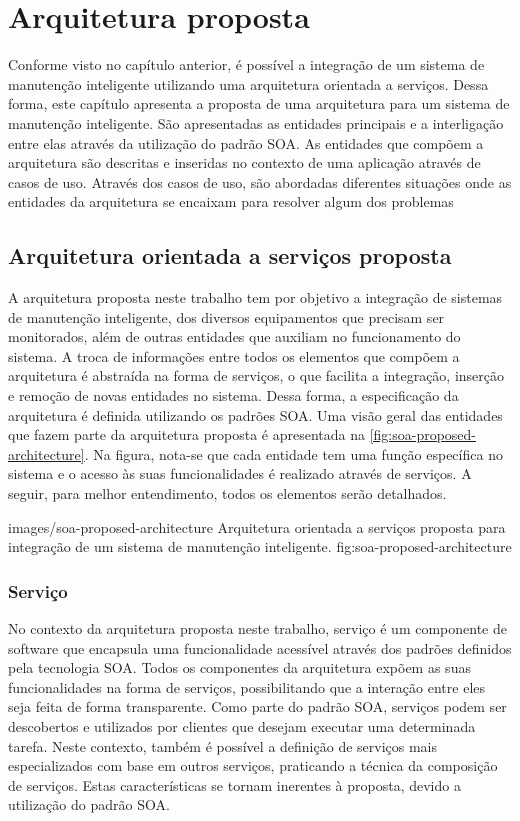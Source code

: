 \chapter{Arquitetura proposta}

Conforme visto no capítulo anterior, é possível a integração de um sistema de manutenção inteligente
utilizando uma arquitetura orientada a serviços. Dessa forma, este capítulo apresenta a proposta de
uma arquitetura para um sistema de manutenção inteligente. São apresentadas as entidades principais
e a interligação entre elas através da utilização do padrão \gls{SOA}. As entidades que compõem a
arquitetura são descritas e inseridas no contexto de uma aplicação através de casos de uso. Através
dos casos de uso, são abordadas diferentes situações onde as entidades da arquitetura se encaixam
para resolver algum dos problemas


\section{Arquitetura orientada a serviços proposta}

A arquitetura proposta neste trabalho tem por objetivo a integração de sistemas de manutenção
inteligente, dos diversos equipamentos que precisam ser monitorados, além de outras entidades que
auxiliam no funcionamento do sistema. A troca de informações entre todos os elementos que compõem a
arquitetura é abstraída na forma de serviços, o que facilita a integração, inserção e remoção de
novas entidades no sistema. Dessa forma, a especificação da arquitetura é definida utilizando os
padrões \gls{SOA}. Uma visão geral das entidades que fazem parte da arquitetura proposta é
apresentada na \cref{fig:soa-proposed-architecture}. Na figura, nota-se que cada entidade tem uma função específica no sistema
e o acesso às suas funcionalidades é realizado através de serviços. A seguir, para melhor
entendimento, todos os elementos serão detalhados.

  {images/soa-proposed-architecture}
  {Arquitetura orientada a serviços proposta para integração de um sistema de manutenção
      inteligente.}
  {fig:soa-proposed-architecture}


\subsection{Serviço}

No contexto da arquitetura proposta neste trabalho, serviço é um componente de software que
encapsula uma funcionalidade acessível através dos padrões definidos pela tecnologia \gls{SOA}.
Todos os componentes da arquitetura expõem as suas funcionalidades na forma de serviços,
possibilitando que a interação entre eles seja feita de forma transparente. Como parte do padrão
\gls{SOA}, serviços podem ser descobertos e utilizados por clientes que desejam executar uma
determinada tarefa. Neste contexto, também é possível a definição de serviços mais especializados
com base em outros serviços, praticando a técnica da composição de serviços. Estas características
se tornam inerentes à proposta, devido a utilização do padrão \gls{SOA}.


